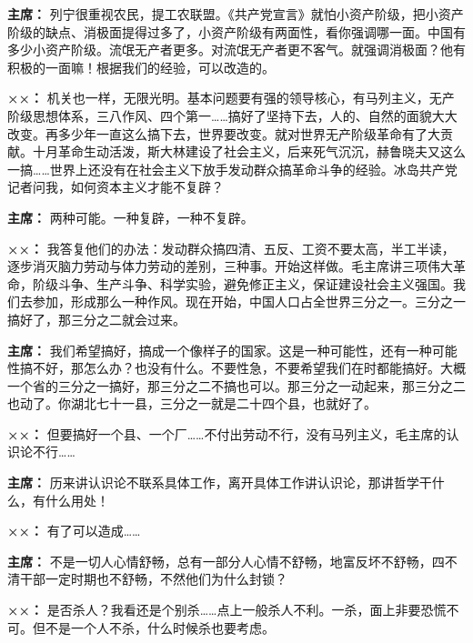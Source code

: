 \begin{duihua}
\item[\textbf{主席：}] 列宁很重视农民，提工农联盟。《共产党宣言》就怕小资产阶级，把小资产阶级的缺点、消极面提得过多了，小资产阶级有两面性，看你强调哪一面。中国有多少小资产阶级。流氓无产者更多。对流氓无产者更不客气。就强调消极面？他有积极的一面嘛！根据我们的经验，可以改造的。

\item[\textbf{××：}] 机关也一样，无限光明。基本问题要有强的领导核心，有马列主义，无产阶级思想体系，三八作风、四个第一……搞好了坚持下去，人的、自然的面貌大大改变。再多少年一直这么搞下去，世界要改变。就对世界无产阶级革命有了大贡献。十月革命生动活泼，斯大林建设了社会主义，后来死气沉沉，赫鲁晓夫又这么一搞……世界上还没有在社会主义下放手发动群众搞革命斗争的经验。冰岛共产党记者问我，如何资本主义才能不复辟？

\item[\textbf{主席：}] 两种可能。一种复辟，一种不复辟。

\item[\textbf{××：}] 我答复他们的办法：发动群众搞四清、五反、工资不要太高，半工半读，逐步消灭脑力劳动与体力劳动的差别，三种事。开始这样做。毛主席讲三项伟大革命，阶级斗争、生产斗争、科学实验，避免修正主义，保证建设社会主义强国。我们去参加，形成那么一种作风。现在开始，中国人口占全世界三分之一。三分之一搞好了，那三分之二就会过来。

\item[\textbf{主席：}] 我们希望搞好，搞成一个像样子的国家。这是一种可能性，还有一种可能性搞不好，那怎么办？也没有什么。不要性急，不要希望我们在时都能搞好。大概一个省的三分之一搞好，那三分之二不搞也可以。那三分之一动起来，那三分之二也动了。你湖北七十一县，三分之一就是二十四个县，也就好了。

\item[\textbf{××：}] 但要搞好一个县、一个厂……不付出劳动不行，没有马列主义，毛主席的认识论不行……

\item[\textbf{主席：}] 历来讲认识论不联系具体工作，离开具体工作讲认识论，那讲哲学干什么，有什么用处！

\item[\textbf{××：}] 有了可以造成……

\item[\textbf{主席：}] 不是一切人心情舒畅，总有一部分人心情不舒畅，地富反坏不舒畅，四不清干部一定时期也不舒畅，不然他们为什么封锁？

\item[\textbf{××：}] 是否杀人？我看还是个别杀……点上一般杀人不利。一杀，面上非要恐慌不可。但不是一个人不杀，什么时候杀也要考虑。


\end{duihua}
